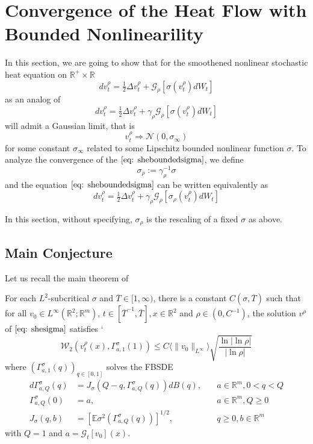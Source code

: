 \newcommand{\hsemig}[2]{\mathcal{G}_{#1}\left[{#2}\right]}

\section{Convergence of the Heat Flow with Bounded Nonlinearility}

In this section, we are going to show that for the smoothened nonlinear stochastic heat equation on $\mathbb{R}^+\times\mathbb{R}$
\[
dv_t^{\rho} = \tfrac{1}{2}\Delta v_t^{\rho}+\hsemig{\rho}{\sigma(v_t^{\rho})dW_t}\label{eq: sheboundedsigma} \tag{SHEBD}
\]
as an analog of
\[
dv_t^{\rho} = \tfrac{1}{2}\Delta v_t^{\rho}+\gamma_{\rho}\hsemig{\rho}{\sigma(v_t^{\rho})dW_t}\label{eq: shesigma} \tag{SHE}
\]
will admit a Gaussian limit, that is
\[
v_t^{\rho} \Rightarrow \mathcal{N}(0,\sigma_{\infty})
\]
for some constant $\sigma_{\infty}$ related to some Lipschitz bounded nonlinear function $\sigma$. To analyze the convergence of the $\eqref{eq: sheboundedsigma}$, we define
\[
\sigma_{\rho} := \gamma_{\rho}^{-1}\sigma
\]
and the equation $\eqref{eq: sheboundedsigma}$ can be written equivalently as
\[
dv_t^{\rho} = \tfrac{1}{2}\Delta v_t^{\rho}+\gamma_{\rho}\hsemig{\rho}{\sigma_{\rho}(v_t^{\rho})dW_t}\label{eq: shetobesolved}\tag{SHETB}
\]

In this section, without specifying, $\sigma_{\rho}$ is the rescaling of a fixed $\sigma$ as above.

\subsection{Main Conjecture}

Let us recall the main theorem of \cite{dunlap2026renormalizationflow2dnonlinear}

\begin{theorem}
    For each $L^2$-subcritical $\sigma$ and $\overline{T}\in[1,\infty)$, there is a constant $C(\sigma,\overline{T})$ such that for all $v_0 \in L^{\infty}(\mathbb{R}^2;\mathbb{R}^m)$, $t\in[\overline{T}^{-1},\overline{T}], x\in\mathbb{R}^2$ and $\rho\in(0,C^{-1})$, the solution $v^{\rho}$ of $\eqref{eq: shesigma}$ satisfies
`   \[
    \mathcal{W}_2(v_t^{\rho}(x),\Gamma_{a,1}^{\sigma}(1))\leq C\langle\lVert v_0\rVert_{L^{\infty}}\rangle\sqrt{\dfrac{\ln|\ln \rho|}{|\ln \rho|}}
    \]
    where $(\Gamma_{a,1}^{\sigma}(q))_{q\in[0,1]}$ solves the FBSDE 
    \[
    \begin{aligned}
        d\Gamma^{\sigma}_{a,Q}(q) &= J_{\sigma}(Q-q,\Gamma^{\sigma}_{a,Q}(q))dB(q),\quad &a\in\mathbb{R}^m, 0 < q <Q \\
        \Gamma^{\sigma}_{a,Q}(0) &= a, &a\in\mathbb{R}^m,Q\geq0 \\
        J_{\sigma}(q,b) &= [\mathbb{E}\sigma^2(\Gamma^{\sigma}_{a,Q}(q))]^{1/2},&q\geq 0,b\in \mathbb{R}^m
    \end{aligned}\label{eq: fbsde}\tag{FBSDE}\]
    with $Q=1$ and $a = \hsemig{t}{v_0}(x)$.
\end{theorem}

